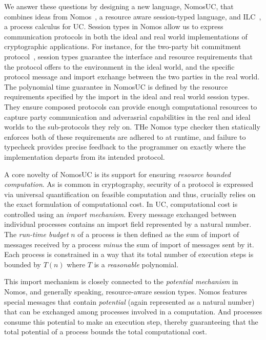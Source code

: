 We answer these questions by designing a new language, NomosUC, that combines ideas from
Nomos~\cite{dasnomos}, a resource aware session-typed language, and ILC~\cite{ilc},
a process calculus for UC.
Session types in Nomos allow us to express communication protocols in both the ideal and
real world implementations of cryptographic applications.
For instance, for the two-party bit commitment protocol~\cite{rocommitment}, session types guarantee
the interface and resource requirements that the protocol offers to the environment in the ideal world, and the specific protocol 
message and import exchange between the two parties in the real world.
The polynomial time guarantee in NomosUC is defined by the resource requirements specified by the import in the ideal and real world
session types.
They ensure composed protocols can provide enough computational resources to capture party communication and adverasrial capabilities in the real and ideal worlds to the sub-protocols they rely on.
THe Nomos type checker then statically enforces both of these requirements are adhered to at runtime, and  
failure to typecheck provides precise feedback to the programmer on exactly where the
implementation departs from its intended protocol.

A core novelty of NomosUC is its support for ensuring \emph{resource bounded computation}.
As is common in cryptography, security of a protocol is expressed via universal quantification
on feasible computation and thus, crucially relies on the exact formulation of computational cost.
In UC, computational cost is controlled using an \emph{import mechanism}.
Every message exchanged between individual processes contains an import field represented by
a natural number.
The \emph{run-time budget} $n$ of a process is then defined as the sum of import of messages
received by a process \emph{minus} the sum of import of messages sent by it.
Each process is constrained in a way that its total number of execution steps is bounded
by $T(n)$ where $T$ is a \emph{reasonable} polynomial.

This import mechanism is closely connected to the \emph{potential mechanism} in Nomos, and
generally speaking, resource-aware session types.
Nomos features special messages that contain \emph{potential} (again represented as a natural
number) that can be exchanged among processes involved in a computation.
And processes consume this potential to make an execution step, thereby guaranteeing that
the total potential of a process bounds the total computational cost.

